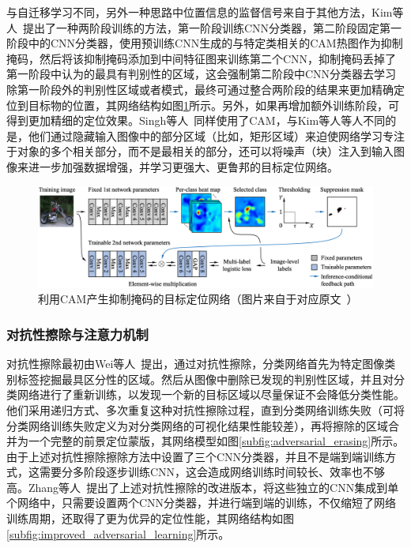 与自迁移学习不同，另外一种思路中位置信息的监督信号来自于其他方法，Kim等人~\cite{Kim_2017_ICCV}提出了一种两阶段训练的方法，第一阶段训练CNN分类器，第二阶段固定第一阶段中的CNN分类器，使用预训练CNN生成的与特定类相关的CAM热图作为抑制掩码，然后将该抑制掩码添加到中间特征图来训练第二个CNN，抑制掩码丢掉了第一阶段中认为的最具有判别性的区域，这会强制第二阶段中CNN分类器去学习除第一阶段外的判别性区域或者模式，最终可通过整合两阶段的结果来更加精确定位到目标物的位置，其网络结构如图\ref{fig:cam_based_weakly_supervised_localization}所示。另外，如果再增加额外训练阶段，可得到更加精细的定位效果。Singh等人~\cite{Krishna2018}同样使用了CAM，与Kim等人等人不同的是，他们通过隐藏输入图像中的部分区域（比如，矩形区域）来迫使网络学习专注于对象的多个相关部分，而不是最相关的部分，还可以将噪声（块）注入到输入图像来进一步加强数据增强，并学习更强大、更鲁邦的目标定位网络。

\begin{figure}[h]
	\centering
	\includegraphics[width=1.0\textwidth]{figure/cam_based_weakly_supervised_localization}
	\caption{利用CAM产生抑制掩码的目标定位网络（图片来自于对应原文~\cite{Krishna2018}）}
	\label{fig:cam_based_weakly_supervised_localization}
\end{figure}

\subsubsection{对抗性擦除与注意力机制}
对抗性擦除最初由Wei等人~\cite{WeiFLCZY17}提出，通过对抗性擦除，分类网络首先为特定图像类别标签挖掘最具区分性的区域。然后从图像中删除已发现的判别性区域，并且对分类网络进行了重新训练，以发现一个新的目标区域以尽量保证不会降低分类性能。他们采用递归方式、多次重复这种对抗性擦除过程，直到分类网络训练失败（可将分类网络训练失败定义为对分类网络的可视化结果性能较差），再将擦除的区域合并为一个完整的前景定位蒙版，其网络模型如图\ref{subfig:adversarial_erasing}所示。由于上述对抗性擦除擦除方法中设置了三个CNN分类器，并且不是端到端训练方式，这需要分多阶段逐步训练CNN，这会造成网络训练时间较长、效率也不够高。Zhang等人~\cite{ZhangWF0H18}提出了上述对抗性擦除的改进版本，将这些独立的CNN集成到单个网络中，只需要设置两个CNN分类器，并进行端到端的训练，不仅缩短了网络训练周期，还取得了更为优异的定位性能，其网络结构如图\ref{subfig:improved_adversarial_learning}所示。

